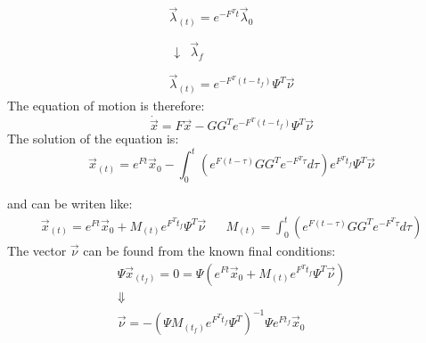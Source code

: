 \documentclass[11pt, a4paper]{article}
\begin{document}
\begin{equation}
    \begin{matrix}
        \vec{\lambda}_{\left(t\right)}=e^{-F^Tt}\vec{\lambda}_0 \\\\
        \begin{matrix}
            \downarrow & \vec{\lambda}_f
        \end{matrix} \\\\
        \vec{\lambda}_{\left(t\right)}=e^{-F^T\left(t-t_f\right)}\Psi^T\vec{\nu}
    \end{matrix}
\end{equation}
The equation of motion is therefore:
\begin{equation}
    \dot{\vec{x}}=F\vec{x}-GG^Te^{-F^T\left(t-t_f\right)}\Psi^T\vec{\nu}
\end{equation}
The solution of the equation is:
\begin{equation}
    \vec{x}_{\left(t\right)}=e^{Ft}\vec{x}_0-\int_0^t\left(e^{F\left(t-\tau\right)}GG^Te^{-F^T\tau}d\tau\right)e^{F^Tt_f}\Psi^T\vec{\nu}
\end{equation}
            
and can be writen like:
\begin{equation}
    \begin{matrix}
       \displaystyle\vec{x}_{\left(t\right)}=e^{Ft}\vec{x}_0+M_{\left(t\right)}e^{F^Tt_f}\Psi^T\vec{\nu} &&\displaystyle M_{\left(t\right)}=\int_0^t\left(e^{F\left(t-\tau\right)}GG^Te^{-F^T\tau}d\tau\right)
    \end{matrix}
\end{equation}
The vector $\vec{\nu}$ can be found from the known final conditions:
\begin{equation}
    \begin{array}{c}
        \Psi\vec{x}_{\left(t_f\right)}=0=\Psi\left(e^{Ft}\vec{x}_0+M_{\left(t\right)}e^{F^Tt_f}\Psi^T\vec{\nu}\right) \\
        \Downarrow \\
        \vec{\nu}=-\left(\Psi M_{\left(t_f\right)}e^{F^Tt_f}\Psi^T\right)^{-1}\Psi e^{Ft_f}\vec{x}_0
    \end{array}
\end{equation}
\newpage
\end{document}
